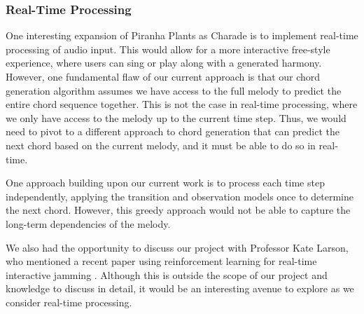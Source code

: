 \subsubsection{Real-Time Processing}

One interesting expansion of Piranha Plants as Charade is to implement real-time processing of audio input. This would allow for a more interactive free-style experience, where users can sing or play along with a generated harmony. However, one fundamental flaw of our current approach is that our chord generation algorithm assumes we have access to the full melody to predict the entire chord sequence together. This is not the case in real-time processing, where we only have access to the melody up to the current time step. Thus, we would need to pivot to a different approach to chord generation that can predict the next chord based on the current melody, and it must be able to do so in real-time.

One approach building upon our current work is to process each time step independently, applying the transition and observation models once to determine the next chord. However, this greedy approach would not be able to capture the long-term dependencies of the melody.

We also had the opportunity to discuss our project with Professor Kate Larson, who mentioned a recent paper using reinforcement learning for real-time interactive jamming \autocite{ReaLJam:2025}. Although this is outside the scope of our project and knowledge to discuss in detail, it would be an interesting avenue to explore as we consider real-time processing.

